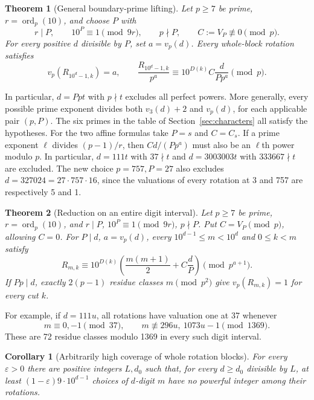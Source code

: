 \documentclass[10pt]{article}
\newtheorem{theorem}{Theorem}
\newtheorem{corollary}{Corollary}
\begin{document}
\begin{theorem}[General boundary-prime lifting]\label{thm:general-prime}
Let $p\ge7$ be prime, $r=\operatorname{ord}_p(10)$, and choose $P$ with
\[
 r\mid P,\qquad 10^P\equiv1\pmod{9r},\qquad p\nmid P,\qquad
 C:=V_P\not\equiv0\pmod p.
\]
For every positive $d$ divisible by $P$, set $a=v_p(d)$.
Every whole-block rotation satisfies
\begin{equation}\label{eq:general-valuation}
 v_p(R_{10^d-1,k})=a,\qquad
 \frac{R_{10^d-1,k}}{p^a}
 \equiv10^{D(k)}C\frac{d}{Pp^a}\pmod p.
\end{equation}
\end{theorem}
In particular, $d=Ppt$ with $p\nmid t$ excludes all perfect powers.
More generally, every possible prime exponent divides both
$v_3(d)+2$ and $v_p(d)$, for each applicable pair $(p,P)$.
The six primes in the table of Section~\ref{sec:characters} all satisfy the
hypotheses. For the two affine formulas take $P=s$ and $C=C_s$.
If a prime exponent $\ell$ divides $(p-1)/r$, then
$Cd/(Pp^a)$ must also be an $\ell$th power modulo $p$.
In particular, $d=111t$ with $37\nmid t$ and $d=3003003t$ with $333667\nmid t$
are excluded. The new choice $p=757,P=27$ also excludes
$d=327024=27\cdot757\cdot16$, since the valuations of every rotation
at 3 and 757 are respectively 5 and 1.

\begin{theorem}[Reduction on an entire digit interval]\label{thm:digit-interval}
Let $p\ge7$ be prime, $r=\operatorname{ord}_p(10)$, and
$r\mid P$, $10^P\equiv1\pmod{9r}$, $p\nmid P$.
Put $C=V_P\pmod p$, allowing $C=0$.
For $P\mid d$, $a=v_p(d)$, every $10^{d-1}\le m<10^d$ and $0\le k<m$ satisfy
\begin{equation}\label{eq:interval-quadratic}
 R_{m,k}\equiv10^{D(k)}
 \left(\frac{m(m+1)}2+C\frac dP\right)\pmod{p^{a+1}}.
\end{equation}
If $Pp\mid d$, exactly $2(p-1)$ residue classes $m\pmod{p^2}$ give
$v_p(R_{m,k})=1$ for every cut $k$.
\end{theorem}
For example, if $d=111u$, all rotations have valuation one at 37 whenever
\[
 m\equiv0,-1\pmod{37},\qquad
 m\not\equiv296u,\ 1073u-1\pmod{1369}.
\]
These are 72 residue classes modulo 1369 in every such digit interval.

\begin{corollary}[Arbitrarily high coverage of whole rotation blocks]\label{cor:interval-coverage}
For every $\varepsilon>0$ there are positive integers $L,d_0$ such that,
for every $d\ge d_0$ divisible by $L$, at least
$(1-\varepsilon)9\cdot10^{d-1}$ choices of $d$-digit $m$ have no powerful
integer among their rotations.
\end{corollary}
\end{document}
